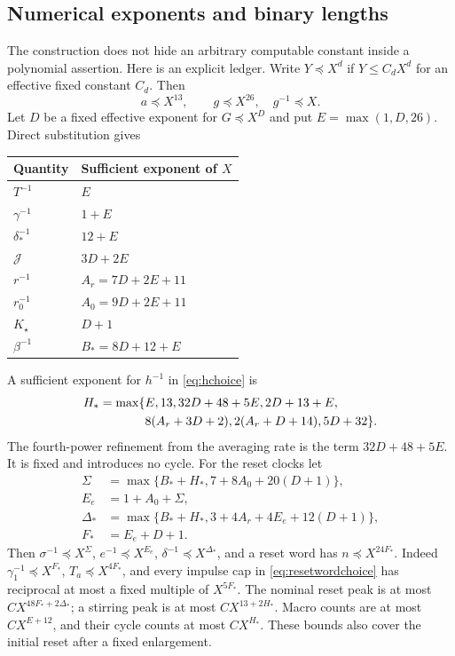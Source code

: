 \documentclass[11pt,a4paper]{amsart}
\theoremstyle{definition}
\theoremstyle{remark}
\numberwithin{equation}{section}
\begin{document}
\subsection{Numerical exponents and binary lengths}
The construction does not hide an arbitrary computable constant inside a polynomial assertion. Here is an explicit ledger. Write $Y\preccurlyeq X^d$ if $Y\le C_dX^d$ for an effective fixed constant $C_d$. Then
\[
 a\preccurlyeq X^{13},\qquad g\preccurlyeq X^{26},\quad
 g^{-1}\preccurlyeq X.
\]
Let $D$ be a fixed effective exponent for $G\preccurlyeq X^D$ and put $E=\max(1,D,26)$. Direct substitution gives
\begin{center}
\begin{tabular}{@{}ll@{}}
\toprule
Quantity & Sufficient exponent of $X$\\
\midrule
$T^{-1}$ & $E$\\
$\gamma^{-1}$ & $1+E$\\
$\delta_*^{-1}$ & $12+E$\\
$\mathcal J$ & $3D+2E$\\
$r^{-1}$ & $A_r=7D+2E+11$\\
$r_0^{-1}$ & $A_0=9D+2E+11$\\
$K_\star$ & $D+1$\\
$\beta^{-1}$ & $B_*=8D+12+E$\\
\bottomrule
\end{tabular}
\end{center}
A sufficient exponent for $h^{-1}$ in \eqref{eq:hchoice} is
\begin{align}\label{eq:hpower}
 H_* =\max\{&E,13,32D+48+5E,2D+13+E,\notag\\
 &8(A_r+3D+2),2(A_r+D+14),5D+32\}.
\end{align}
The fourth-power refinement from the averaging rate is the term $32D+48+5E$. It is fixed and introduces no cycle.
For the reset clocks let
\begin{align*}
 \Sigma&=\max\{B_*+H_*,7+8A_0+20(D+1)\},\\
 E_e&=1+A_0+\Sigma,\\
 \Delta_*&=\max\{B_*+H_*,3+4A_r+4E_e+12(D+1)\},\\
 F_*&=E_e+D+1.
\end{align*}
Then $\sigma^{-1}\preccurlyeq X^\Sigma$, $e^{-1}\preccurlyeq X^{E_e}$,
$\delta^{-1}\preccurlyeq X^{\Delta_*}$, and a reset word has
$n\preccurlyeq X^{24F_*}$. Indeed $\gamma_1^{-1}\preccurlyeq X^{F_*}$,
$T_a\preccurlyeq X^{4F_*}$, and every impulse cap in
\eqref{eq:resetwordchoice} has reciprocal at most a fixed multiple of $X^{5F_*}$.
The nominal reset peak is at most $CX^{48F_*+2\Delta_*}$; a stirring peak is at most $CX^{13+2H_*}$. Macro counts are at most $CX^{E+12}$, and their cycle counts at most $CX^{H_*}$. These bounds also cover the initial reset after a fixed enlargement.
\end{document}
